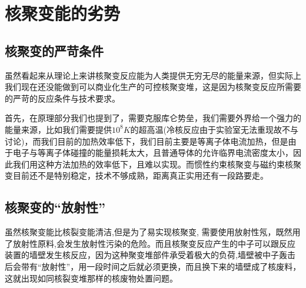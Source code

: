 \section{核聚变能的劣势}
\subsection{核聚变的严苛条件}
虽然看起来从理论上来讲核聚变反应能为人类提供无穷无尽的能量来源，但实际上我们现在还没能做到可以商业化生产的可控核聚变堆，这是因为核聚变反应所需要的严苛的反应条件与技术要求。


首先，在原理部分我们也提到了，需要克服库仑势垒，我们需要外界给一个强力的能量来源，比如我们需要提供$10^{8}K$的超高温(冷核反应由于实验室无法重现故不与讨论)，而我们目前的加热效率低下，我们目前主要是等离子体电流加热，但是由于电子与等离子体碰撞的能量损耗太大，且普通导体的允许临界电流密度太小，因此我们用这种方法加热的效率低下，且难以实现。而惯性约束核聚变与磁约束核聚变目前还不是特别稳定，技术不够成熟，距离真正实用还有一段路要走。
\subsection{核聚变的“放射性”}
虽然核聚变能比核裂变能清洁,但是为了易实现核聚变, 需要使用放射性氖，既然用了放射性原料,会发生放射性污染的危险。而且核聚变反应产生的中子可以跟反应装置的墙壁发生核反应，因为这种聚变堆部件承受着极大的负荷,墙壁被中子轰击后会带有“放射性”，用一段时间之后就必须更换，而且换下来的墙壁成了核废料，这就出现如同核裂变堆那样的核废物处置问题。
